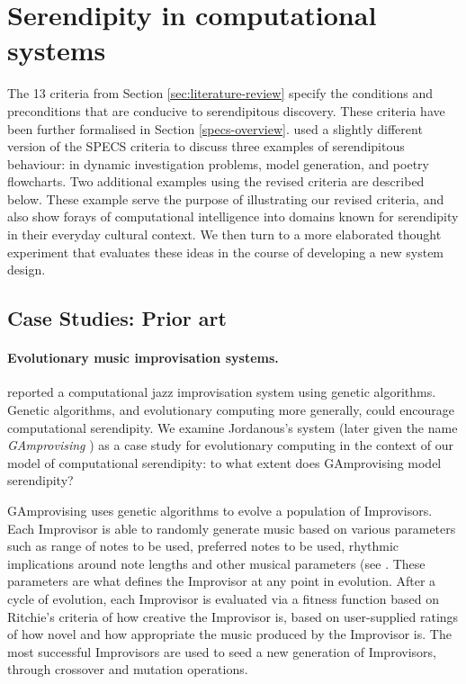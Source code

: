 \section{Serendipity in computational systems} \label{sec:computational-serendipity}

The 13 criteria from Section \ref{sec:literature-review} specify the
conditions and preconditions that are conducive to serendipitous
discovery.  These criteria have been further formalised
in Section \ref{specs-overview}.
% 
 used a slightly different version of the
SPECS criteria to discuss three examples of serendipitous behaviour:
in dynamic investigation problems, model generation, and poetry
flowcharts.  Two additional examples using the revised criteria are
described below.  These example serve the purpose of illustrating our
revised criteria, and also show forays of computational intelligence
into domains known for serendipity in their everyday cultural context.
We then turn to a more elaborated thought experiment that evaluates
these ideas in the course of developing a new system design.

% 

\subsection{Case Studies: Prior art}

\paragraph{Evolutionary music improvisation systems.}

 reported a computational jazz improvisation system using genetic algorithms. Genetic algorithms, and evolutionary computing more generally, could encourage computational serendipity. We examine Jordanous's system (later given the name {\em GAmprovising} \cite{jordanous:12}) as a case study for evolutionary computing in the context of our model of computational serendipity: to what extent does GAmprovising model serendipity?

GAmprovising uses genetic algorithms to evolve a population of Improvisors. Each Improvisor is able to randomly generate music based on various parameters such as range of notes to be used, preferred notes to be used, rhythmic implications around note lengths and other musical parameters (see \cite{jordanous10}. These parameters are what defines the Improvisor at any point in evolution. After a cycle of evolution, each Improvisor is evaluated via a fitness function based on Ritchie's criteria \cite{ritchie07} of how creative the Improvisor is, based on user-supplied ratings of how novel and how appropriate the music produced by the Improvisor is. The most successful Improvisors are used to seed a new generation of Improvisors, through crossover and mutation operations.


